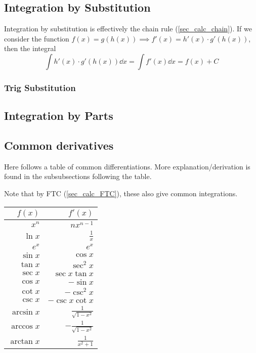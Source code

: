 \documentclass[fleqn,a4paper,11pt]{article}
\begin{document}
    \subsection{Integration by Substitution} \label{sec_calc_substitution}

    Integration by substitution is effectively the chain rule
    (\ref{sec_calc_chain}). If we consider the function
    \(f(x) = g(h(x)) \implies f'(x) = h'(x) \cdot g'(h(x))\), then the integral
    \begin{equation}
    \int h'(x) \cdot g'(h(x)) \dd{x} = \int f'(x) \dd{x} = f(x) + C
    \end{equation}

    \subsubsection{Trig Substitution} \label{sec_calc_trig_substitution}

    \subsection{Integration by Parts}

    \subsection{Common derivatives} \label{calc:common}


    Here follows a table of common differentiations. More explanation/derivation
    is found in the subsubsections following the table.

    Note that by FTC (\ref{sec_calc_FTC}), these also give common integrations.


    \begin{longtable}{rr}
    \toprule
    \boldmath\(f(x)\) & \boldmath\(f'(x)\) \\
    \midrule
    \endhead
    \(x^n\) & \(nx^{n-1}\) \\
    \(\ln x\) & \(\frac{1}{x}\) \\
    \(e^x\) & \(e^x\) \\
    \(\sin x\) & \(\cos x\) \\
    \(\tan x\) & \(\sec^2 x\) \\
    \(\sec x\) & \(\sec x \tan x\) \\
    \(\cos x\) & \(-\sin x\) \\
    \(\cot x\) & \(-\csc^2 x\) \\
    \(\csc x\) & \(-\csc x \cot x\) \\
    \(\arcsin x\) & \(\frac{1}{\sqrt{1 - x^2}}\) \\
    \(\arccos x\) & \(-\frac{1}{\sqrt{1 - x^2}}\) \\
    \(\arctan x\) & \(\frac{1}{x^2 + 1}\) \\
    \bottomrule
    \end{longtable}
\end{document}
